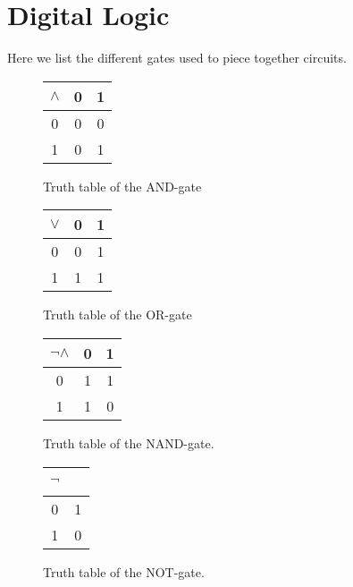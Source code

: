 %
%

\section{Digital Logic}
Here we list the different gates used to piece together circuits.

\usetikzlibrary{arrows,positioning}
\begin{multicols}{4}
	
	\begin{figure}[H]
		\center
%			
%			
		\begin{tabular}{c|cc}
			$\land$ & 0 & 1 \\ \hline
			0 & 0 & 0 \\
			1 & 0 & 1
		\end{tabular}
		\label{table:and-gate}
		\caption{Truth table of the AND-gate}
	\end{figure}
	
	\vfill
	\columnbreak
			
	\begin{figure}[H]
		\center
		\begin{tabular}{c|cc}
			$\lor$ & 0 & 1 \\ \hline
			0 & 0 & 1 \\
			1 & 1 & 1
		\end{tabular}
		\label{table:or-gate}
		\caption{Truth table of the OR-gate}
	\end{figure}
	
	\vfill
	\columnbreak

	\begin{figure}[H]
		\center
		\begin{tabular}{c|cc}
			$\neg\land$ & 0 & 1 \\ \hline
			0 & 1 & 1 \\
			1 & 1 & 0
		\end{tabular}
		\label{table:nand-gate}
		\caption{Truth table of the NAND-gate.}
	\end{figure}
	
	\vfill
	\columnbreak

	\begin{figure}[H]
		\center
		\begin{tabular}{c|c}
			$\neg$ & {\ } \\ \hline
			0 & 1 \\
			1 & 0
		\end{tabular}
		\label{table:not-gate}
		\caption{Truth table of the NOT-gate.}
	\end{figure}
	
\end{multicols}

